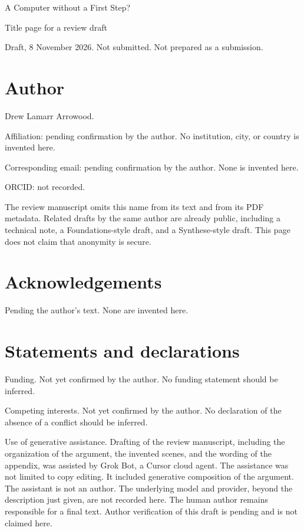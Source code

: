 \documentclass[11pt]{article}
\begin{document}
\begin{center}
{\Large A Computer without a First Step?\par}
\vspace{1.5em}
{\large Title page for a review draft\par}
\vspace{0.4em}
Draft, 8 November 2026. Not submitted. Not prepared as a submission.\par
\end{center}

\section*{Author}
Drew Lamarr Arrowood.

Affiliation: pending confirmation by the author. No institution, city, or country is invented here.

Corresponding email: pending confirmation by the author. None is invented here.

ORCID: not recorded.

The review manuscript omits this name from its text and from its PDF metadata. Related drafts by the same author are already public, including a technical note, a Foundations-style draft, and a Synthese-style draft. This page does not claim that anonymity is secure.

\section*{Acknowledgements}
Pending the author's text. None are invented here.

\section*{Statements and declarations}
Funding. Not yet confirmed by the author. No funding statement should be inferred.

Competing interests. Not yet confirmed by the author. No declaration of the absence of a conflict should be inferred.

Use of generative assistance. Drafting of the review manuscript, including the organization of the argument, the invented scenes, and the wording of the appendix, was assisted by Grok Bot, a Cursor cloud agent. The assistance was not limited to copy editing. It included generative composition of the argument. The assistant is not an author. The underlying model and provider, beyond the description just given, are not recorded here. The human author remains responsible for a final text. Author verification of this draft is pending and is not claimed here.
\end{document}
